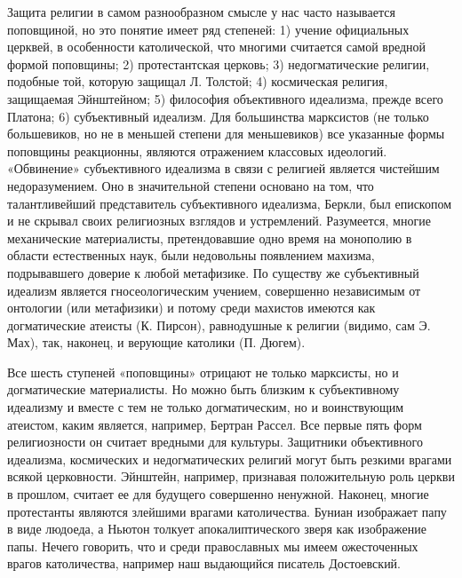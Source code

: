 Защита религии  в самом  разнообразном смысле  у нас  часто называется
поповщиной, но это  понятие имеет ряд степеней:  1) учение официальных
церквей,   в   особенности   католической,   что   многими   считается
самой  вредной   формой  поповщины;  2)  протестантская   церковь;  3)
недогматические религии, подобные той,  которую защищал Л. Толстой; 4)
космическая религия, защищаемая  Эйнштейном; 5) философия объективного
идеализма,  прежде  всего  Платона;   6)  субъективный  идеализм.  Для
большинства  марксистов  (не  только  большевиков,  но  не  в  меньшей
степени  для меньшевиков)  все указанные  формы поповщины  реакционны,
являются  отражением  классовых идеологий.  «Обвинение»  субъективного
идеализма в связи с религией  является чистейшим недоразумением. Оно в
значительной степени основано на том, что талантливейший представитель
субъективного  идеализма, Беркли,  был  епископом и  не скрывал  своих
религиозных  взглядов и  устремлений. Разумеется,  многие механические
материалисты,  претендовавшие  одно  время   на  монополию  в  области
естественных  наук, были  недовольны появлением  махизма, подрывавшего
доверие  к  любой метафизике.  По  существу  же субъективный  идеализм
является гносеологическим учением, совершенно независимым от онтологии
(или  метафизики) и  потому среди  махистов имеются  как догматические
атеисты (К. Пирсон), равнодушные к  религии (видимо, сам Э. Мах), так,
наконец, и верующие католики (П. Дюгем).

Все  шесть ступеней  «поповщины» отрицают  не только  марксисты, но  и
догматические  материалисты. Но  можно  быть  близким к  субъективному
идеализму и  вместе с тем  не только догматическим, но  и воинствующим
атеистом, каким  является, например,  Бертран Рассел. Все  первые пять
форм  религиозности  он  считает   вредными  для  культуры.  Защитники
объективного  идеализма, космических  и недогматических  религий могут
быть резкими врагами всякой церковности. Эйнштейн, например, признавая
положительную  роль   церкви  в  прошлом,  считает   ее  для  будущего
совершенно  ненужной. Наконец,  многие  протестанты являются  злейшими
врагами католичества. Буниан изображает папу  в виде людоеда, а Ньютон
толкует апокалиптического зверя как изображение папы. Нечего говорить,
что и  среди православных  мы имеем ожесточенных  врагов католичества,
например наш выдающийся писатель Достоевский.

